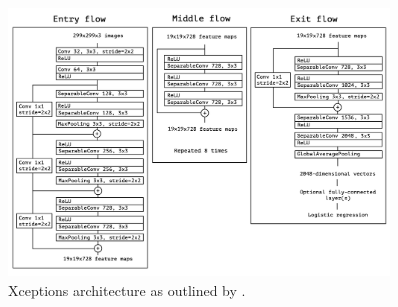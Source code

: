 \begin{figure}[ht]
    \centering
    \includegraphics[width=0.9\textwidth]{figures/xception_architecture.png}
    \caption{Xceptions architecture as outlined by \citeauthor{chollet2017xception}.}\label{fig:xceptionArchitecture}
\end{figure}